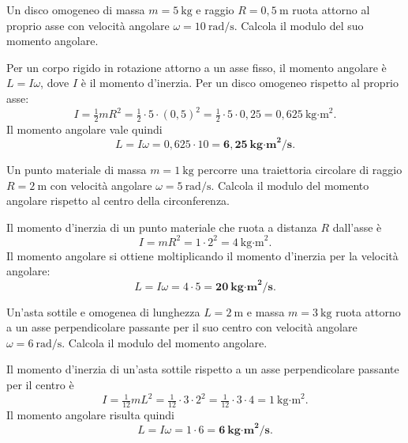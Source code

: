 \begin{question}[ID=2.2, subtitle={Momento angolare di un disco che ruota}, tags={corpo rigido, momento angolare, disco}, difficulty=facile]
Un disco omogeneo di massa $m = 5\ \text{kg}$ e raggio $R = 0{,}5\ \text{m}$ ruota attorno al proprio asse con velocità angolare $\omega = 10\ \text{rad/s}$. Calcola il modulo del suo momento angolare.
\begin{solution}
Per un corpo rigido in rotazione attorno a un asse fisso, il momento angolare è $L = I\omega$, dove $I$ è il momento d'inerzia. Per un disco omogeneo rispetto al proprio asse:
\[
I = \tfrac{1}{2}mR^2 = \tfrac{1}{2}\cdot 5\cdot (0{,}5)^2 = \tfrac{1}{2}\cdot 5\cdot 0{,}25 = 0{,}625\ \text{kg·m}^2.
\]
Il momento angolare vale quindi
\[
L = I\omega = 0{,}625\cdot 10 = \mathbf{6{,}25\ \text{kg·m}^2/\text{s}}.
\]
\end{solution}
\end{question}


\begin{question}[ID=2.3, subtitle={Momento angolare di una massa in traiettoria circolare}, tags={corpo rigido, momento angolare}, difficulty=facile]
Un punto materiale di massa $m = 1\ \text{kg}$ percorre una traiettoria circolare di raggio $R = 2\ \text{m}$ con velocità angolare $\omega = 5\ \text{rad/s}$. Calcola il modulo del momento angolare rispetto al centro della circonferenza.
\begin{solution}
Il momento d'inerzia di un punto materiale che ruota a distanza $R$ dall'asse è
\[
I = mR^2 = 1\cdot 2^2 = 4\ \text{kg·m}^2.
\]
Il momento angolare si ottiene moltiplicando il momento d'inerzia per la velocità angolare:
\[
L = I\omega = 4\cdot 5 = \mathbf{20\ \text{kg·m}^2/\text{s}}.
\]
\end{solution}
\end{question}


\begin{question}[ID=2.4, subtitle={Momento angolare di un'asta che ruota intorno al proprio centro}, tags={corpo rigido, momento angolare, asta}, difficulty=facile]
Un'asta sottile e omogenea di lunghezza $L = 2\ \text{m}$ e massa $m = 3\ \text{kg}$ ruota attorno a un asse perpendicolare passante per il suo centro con velocità angolare $\omega = 6\ \text{rad/s}$. Calcola il modulo del momento angolare.
\begin{solution}
Il momento d'inerzia di un'asta sottile rispetto a un asse perpendicolare passante per il centro è
\[
I = \tfrac{1}{12}mL^2 = \tfrac{1}{12}\cdot 3\cdot 2^2 = \tfrac{1}{12}\cdot 3\cdot 4 = 1\ \text{kg·m}^2.
\]
Il momento angolare risulta quindi
\[
L = I\omega = 1\cdot 6 = \mathbf{6\ \text{kg·m}^2/\text{s}}.
\]
\end{solution}
\end{question}

